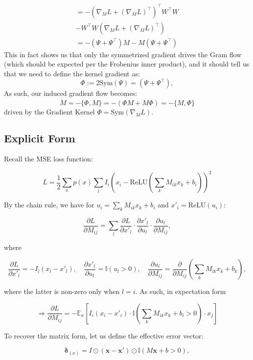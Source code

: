 \documentclass{article}
\theoremstyle{plain}
\numberwithin{equation}{section}
\theoremstyle{definition}
\theoremstyle{remark}
\begin{document}
\begin{align*}=-(\nabla_ML + (\nabla_ML)^\top )^\top W^\top W \\-W^\top W(\nabla_ML + (\nabla_ML)^\top ) \\
=-(\Psi+ \Psi^\top ) M - M(\Psi + \Psi^\top)\end{align*}
This in fact shows us that only the symmetrized gradient drives the Gram flow (which should be expected per the Frobenius inner product), and it should tell us that we need to define the kernel gradient as:$$\Phi:=2\text{Sym}(\Psi) =(\Psi + \Psi^\top),$$
As such, our induced gradient flow becomes: 
\begin{equation} \dot M=-\{\Phi, M\} = - (\Phi M + M\Phi) = -\{M, \Phi\}\end{equation}
driven by the Gradient Kernel $\Phi = \text{Sym}(\nabla_M L)$. 

\subsection{Explicit Form} \label{lemma:gradient-kernel}
Recall the MSE loss function:

$$
L = \frac{1}{2} \sum_{x} p(x) \sum_{i} I_i \left( x_i - \text{ReLU}\left(\sum_{k} M_{ik}x_k + b_i\right) \right)^2
$$

By the chain rule, we have for $u_i = \sum_{k} M_{ik}x_k + b_i$ and $x'_i = \text{ReLU}(u_i)$:

$$
\frac{\partial L}{\partial M_{ij}} = \sum_{l} \frac{\partial L}{\partial x'_l} \cdot \frac{\partial x'_l}{\partial u_l} \cdot \frac{\partial u_l}{\partial M_{ij}},
$$

where

$$
\frac{\partial L}{\partial x'_l} = -I_l(x_l - x'_l), \quad \frac{\partial x'_l}{\partial u_l} = \mathbb{I}(u_l > 0), \quad \frac{\partial u_l}{\partial M_{ij}} = \frac{\partial}{\partial M_{ij}} \left( \sum_{k} M_{lk}x_k + b_k \right),
$$

where the latter is non-zero only when $l=i$. As such, in expectation form

$$
\Rightarrow \frac{\partial L}{\partial M_{ij}} = -\mathbb{E}_x \left[ I_i(x_i - x'_i) \cdot \mathbb{I}\left(\sum_{k} M_{ik}x_k + b_i > 0\right) \cdot x_j \right]
$$

To recover the matrix form, let us define the effective error vector:

$$
\boldsymbol{\delta}_{(x)} = I \odot (\mathbf{x} - \mathbf{x}') \odot \mathbb{I}(M\mathbf{x} + b > 0),
$$
\end{document}
